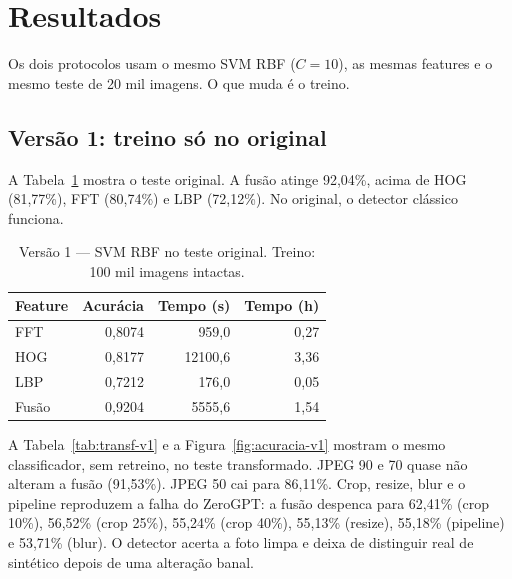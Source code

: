\documentclass[12pt]{article}
\begin{document}
\section{Resultados}
\label{sec:resultados}

Os dois protocolos usam o mesmo SVM RBF ($C=10$), as mesmas features e o mesmo teste de 20 mil imagens. O que muda é o treino.

\subsection{Versão 1: treino só no original}

A Tabela~\ref{tab:svm-v1} mostra o teste original. A fusão atinge 92,04\%, acima de HOG (81,77\%), FFT (80,74\%) e LBP (72,12\%). No original, o detector clássico funciona.

\begin{table}[ht]
\centering
\caption{Versão 1 --- SVM RBF no teste original. Treino: 100 mil imagens intactas.}
\label{tab:svm-v1}
\begin{tabular}{lrrr}
\hline
Feature & Acurácia & Tempo (s) & Tempo (h) \\
\hline
FFT    & 0,8074 & 959,0   & 0,27 \\
HOG    & 0,8177 & 12100,6 & 3,36 \\
LBP    & 0,7212 & 176,0   & 0,05 \\
Fusão  & 0,9204 & 5555,6  & 1,54 \\
\hline
\end{tabular}
\end{table}

A Tabela~\ref{tab:transf-v1} e a Figura~\ref{fig:acuracia-v1} mostram o mesmo classificador, sem retreino, no teste transformado. JPEG 90 e 70 quase não alteram a fusão (91,53\%). JPEG 50 cai para 86,11\%. Crop, resize, blur e o pipeline reproduzem a falha do ZeroGPT: a fusão despenca para 62,41\% (crop 10\%), 56,52\% (crop 25\%), 55,24\% (crop 40\%), 55,13\% (resize), 55,18\% (pipeline) e 53,71\% (blur). O detector acerta a foto limpa e deixa de distinguir real de sintético depois de uma alteração banal.
\end{document}
